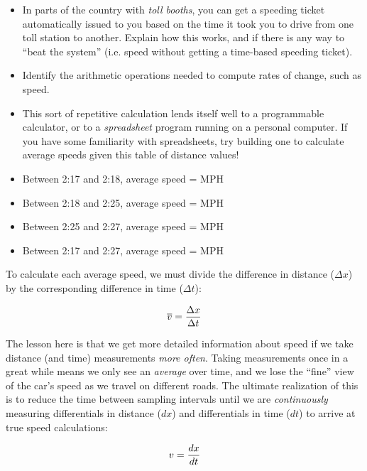 \begin{itemize}
\item{} In parts of the country with {\it toll booths}, you can get a speeding ticket automatically issued to you based on the time it took you to drive from one toll station to another.  Explain how this works, and if there is any way to ``beat the system'' (i.e. speed without getting a time-based speeding ticket).
\item{} Identify the arithmetic operations needed to compute rates of change, such as speed.
\item{} This sort of repetitive calculation lends itself well to a programmable calculator, or to a {\it spreadsheet} program running on a personal computer.  If you have some familiarity with spreadsheets, try building one to calculate average speeds given this table of distance values!
\end{itemize}







\begin{itemize}
\item{} Between 2:17 and 2:18, average speed =  MPH
\vskip 5pt
\item{} Between 2:18 and 2:25, average speed =  MPH
\vskip 5pt
\item{} Between 2:25 and 2:27, average speed =  MPH
\vskip 10pt
\item{} Between 2:17 and 2:27, average speed =  MPH
\end{itemize}







To calculate each average speed, we must divide the difference in distance ($\Delta x$) by the corresponding difference in time ($\Delta t$):

$$\overline{v} = {\Delta x \over \Delta t}$$

\vskip 10pt

The lesson here is that we get more detailed information about speed if we take distance (and time) measurements {\it more often}.  Taking measurements once in a great while means we only see an {\it average} over time, and we lose the ``fine'' view of the car's speed as we travel on different roads.  The ultimate realization of this is to reduce the time between sampling intervals until we are {\it continuously} measuring differentials in distance ($dx$) and differentials in time ($dt$) to arrive at true speed calculations:

$$v = {dx \over dt}$$




